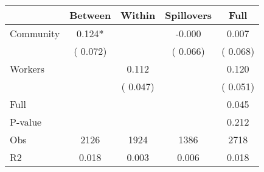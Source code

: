
\begin{tabular}{l*{4}{c}}\hline&\multicolumn{1}{c}{Between}&\multicolumn{1}{c}{Within}&\multicolumn{1}{c}{Spillovers}&\multicolumn{1}{c}{Full}\\ \hline
 Community             &              0.124*      &                                               &       -0.000 &         0.007                            \\ 
                               &        (       0.072)           &                                       &       (       0.066)     &      (       0.068)                                           \\ 
 Workers       &                                               &        0.112    &                                &             0.120                            \\ 
                               &                                               & (       0.047)                  &                                        &      (       0.051)                                           \\ 
\hline                                                                                                                                                                                                                                            
 Full                  &                                               &                                               &                                        &             0.045                                     \\ 
 P-value               &                                               &                                               &                                        &             0.212                                           \\ 
 Obs                   &               2126               &       1924                       &       1386                &              2718                                               \\ 
 R2                    &                      0.018              &              0.003                      &              0.006               &                     0.018                                              \\ 
\hline \end{tabular}                                                                                                                                                                                                              